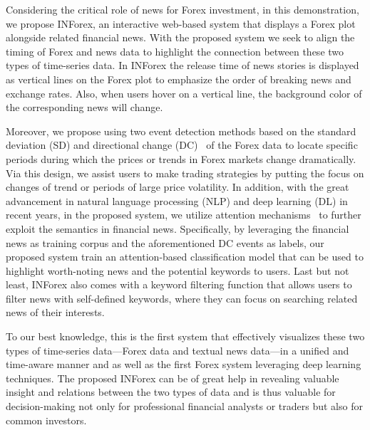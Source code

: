 \documentclass[runningheads]{llncs}
\begin{document}
Considering the critical role of news for Forex investment, in this demonstration, we propose INForex, an interactive web-based system that displays a Forex plot alongside related financial news. With the proposed system we seek to align the timing of Forex and news data to highlight the connection between these two types of time-series data. In INForex the release time of news stories is displayed as vertical lines on the Forex plot to emphasize the order of breaking news and exchange rates. Also, when users hover on a vertical line, the background color of the corresponding news will change. 

Moreover, we propose using two event detection methods based on the standard deviation (SD) and directional change (DC)~\cite{7850020} of the Forex data to locate specific periods during which the prices or trends in Forex markets change dramatically.
Via this design, we assist users to make trading strategies by putting the focus on changes of trend or periods of large price volatility.
In addition, with the great advancement in natural language processing (NLP) and deep learning (DL) in recent years, in the proposed system, we utilize attention mechanisms~\cite{attention} to further exploit the semantics in financial news.
Specifically, by leveraging the financial news as training corpus and the aforementioned DC events as labels, our proposed system train an attention-based classification model that can be used to highlight worth-noting news and the potential keywords to users.
Last but not least, INForex also comes with a keyword filtering function that allows users to filter news with self-defined keywords, where they can focus on searching related news of their interests.

To our best knowledge, this is the first system that effectively visualizes these two types of time-series data---Forex data and textual news data---in a unified and time-aware manner and as well as the first Forex system leveraging deep learning techniques. 
The proposed INForex can be of great help in revealing valuable insight and relations between the two types of data and is thus valuable for decision-making not only for professional financial analysts or traders but also for common investors.

\vspace{-0.5cm}
\end{document}
